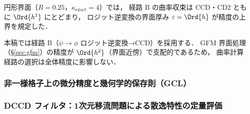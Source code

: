 円形界面（$R = 0.25$，$\kappa_\mathrm{exact} = 4$）では，
経路 B の曲率収束は CCD・CD2 ともに $\Ord{h^1}$ にとどまり，
ロジット逆変換の界面厚み $\varepsilon = \Ord{h}$ が精度の上界を規定した．

本稿では経路 B（$\psi \to \phi$ ロジット逆変換→CCD）を採用する．
GFM 界面処理（§\ref{sec:gfm}）の精度が $\Ord{h^2}$（界面近傍）で支配的であるため，
曲率計算経路の選択は全体精度に影響しない．

\subsubsection{非一様格子上の微分精度と幾何学的保存則（GCL）}
\label{sec:gcl_verification}


\subsubsection{DCCD フィルタ：1次元移流問題による散逸特性の定量評価}
\label{sec:dccd_dissipation_bench}



